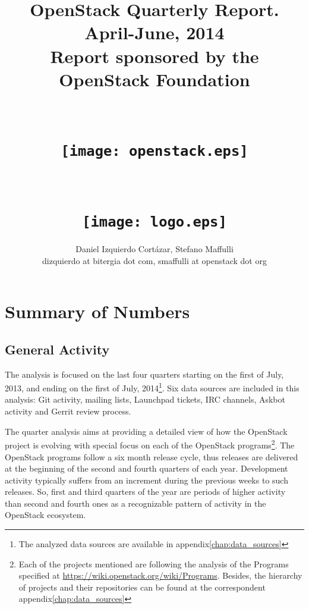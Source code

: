 \documentclass[a4wide,11pt]{report}
\begin{document}
\title{OpenStack Quarterly Report. April-June, 2014 \\
       Report sponsored by the OpenStack Foundation\\
        ~~\\~~\\  \texttt{[image: openstack.eps]}       \\
        ~~\\~~\\  \texttt{[image: logo.eps]}       \\}
\author{Daniel Izquierdo Cort\'azar, Stefano Maffulli\\
        dizquierdo at bitergia dot com, smaffulli at openstack dot org}

\maketitle



\newpage



\setcounter{tocdepth}{4}
\setcounter{secnumdepth}{4}
\tableofcontents



\chapter{Summary of Numbers}

\section{General Activity}

The analysis is focused on the last four quarters starting on the first of July, 2013, and ending on the first of July, 2014\footnote{The analyzed data sources are available in appendix\ref{chap:data_sources}}. Six data sources are included in this analysis: Git activity, mailing lists, Launchpad tickets, IRC channels, Askbot activity and Gerrit review process.

The quarter analysis aims at providing a detailed view of how the OpenStack project is evolving with special focus on each of the OpenStack programs\footnote{Each of the projects mentioned are following the analysis of the Programs specified at \url{https://wiki.openstack.org/wiki/Programs}. Besides, the hierarchy of projects and their repositories can be found at the correspondent appendix\ref{chap:data_sources}}. The OpenStack programs follow a six month release cycle, thus releases are delivered at the beginning of the second and fourth quarters of each year. Development activity typically suffers from an increment during the previous weeks to such releases. So, first and third quarters of the year are periods of higher activity than second and fourth ones as a recognizable pattern of activity in the OpenStack ecosystem.
\end{document}

